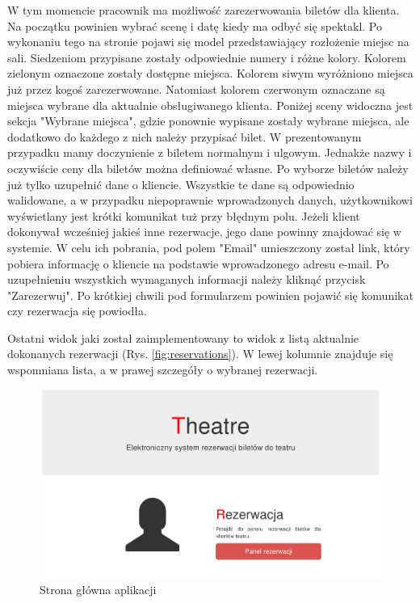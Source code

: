 \documentclass{mgr}
\begin{document}
W tym momencie pracownik ma możliwość zarezerwowania biletów dla klienta. Na początku powinien wybrać scenę i datę kiedy ma odbyć się spektakl. Po wykonaniu tego na stronie pojawi się model przedstawiający rozłożenie miejsc na sali. Siedzeniom przypisane zostały odpowiednie numery i różne kolory. Kolorem zielonym oznaczone zostały dostępne miejsca. Kolorem siwym wyróżniono miejsca już przez kogoś zarezerwowane. Natomiast kolorem czerwonym oznaczane są miejsca wybrane dla aktualnie obsługiwanego klienta. Poniżej sceny widoczna jest sekcja "Wybrane miejsca", gdzie ponownie wypisane zostały wybrane miejsca, ale dodatkowo do każdego z nich należy przypisać bilet. W prezentowanym przypadku mamy doczynienie z biletem normalnym i ulgowym. Jednakże nazwy i oczywiście ceny dla biletów można definiować własne. Po wyborze biletów należy już tylko uzupełnić dane o kliencie. Wszystkie te dane są odpowiednio walidowane, a w przypadku niepoprawnie wprowadzonych danych, użytkownikowi wyświetlany jest krótki komunikat tuż przy błędnym polu. Jeżeli klient dokonywał wcześniej jakieś inne rezerwacje, jego dane powinny znajdować się w systemie. W celu ich pobrania, pod polem "Email" umieszczony został link, który pobiera informację o kliencie na podstawie wprowadzonego adresu e-mail. Po uzupełnieniu wszystkich wymaganych informacji należy kliknąć przycisk "Zarezerwuj". Po krótkiej chwili pod formularzem powinien pojawić się komunikat czy rezerwacja się powiodła. 

Ostatni widok jaki został zaimplementowany to widok z listą aktualnie dokonanych rezerwacji (Rys. \ref{fig:reservations}). W lewej kolumnie znajduje się wspomniana lista, a w prawej szczegóły o wybranej rezerwacji.


\begin{figure}[!ht]
	\centering
	\includegraphics[width=\textwidth]{images/main_page.png}
	\caption{Strona główna aplikacji}
	\label{fig:main-page}
\end{figure}
\end{document}
